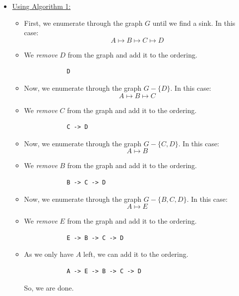 \documentclass[letterpaper]{article}
\begin{document}
\begin{itemize}
    \item \underline{Using Algorithm 1:}
    \begin{itemize}
        \item First, we enumerate through the graph $G$ until we find a sink. In this case:
        \[A \mapsto B \mapsto C \mapsto D\]
        \item We \emph{remove} $D$ from the graph and add it to the ordering.
        \begin{verbatim}
            D
        \end{verbatim}
        \item Now, we enumerate through the graph $G - \{D\}$. In this case:
        \[A \mapsto B \mapsto C\]
        \item We \emph{remove} $C$ from the graph and add it to the ordering. 
        \begin{verbatim}
            C -> D
        \end{verbatim}
        \item Now, we enumerate through the graph $G - \{C, D\}$. In this case: 
        \[A \mapsto B\]
        \item We \emph{remove} $B$ from the graph and add it to the ordering. 
        \begin{verbatim}
            B -> C -> D
        \end{verbatim}
        \item Now, we enumerate through the graph $G - \{B, C, D\}$. In this case: 
        \[A \mapsto E\]
        \item We \emph{remove} $E$ from the graph and add it to the ordering. 
        \begin{verbatim}
            E -> B -> C -> D
        \end{verbatim}
        \item As we only have $A$ left, we can add it to the ordering. 
        \begin{verbatim}
            A -> E -> B -> C -> D
        \end{verbatim}
        So, we are done. 
    \end{itemize}


\end{itemize}
\end{document}
